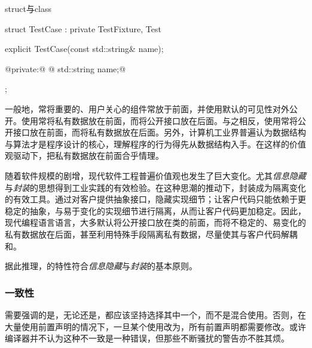 \begin{content}
\begin{episode}{struct与class}
\begin{content}
\begin{c++}
struct TestCase : private TestFixture, Test {
  explicit TestCase(const std::string& name);

@private:@
@  std::string name;@
};
\end{c++}

一般地，常将重要的、用户关心的组件常放于前面，并使用默认的可见性对外公开。使用常将私有数据放在前面，而将公开接口放在后面。与之相反，使用常将公开接口放在前面，而将私有数据放在后面。另外，计算机工业界普遍认为数据结构与算法才是程序设计的核心，理解程序的行为得先从数据结构入手。在这样的价值观驱动下，把私有数据放在前面合乎情理。

随着软件规模的剧增，现代软件工程普遍价值观也发生了巨大变化。尤其\emph{信息隐藏}与\emph{封装}的思想得到工业实践的有效检验。在这种思潮的推动下，封装成为隔离变化的有效工具。通过对客户提供抽象接口，隐藏实现细节；让客户代码只能依赖于更稳定的抽象，与易于变化的实现细节进行隔离，从而让客户代码更加稳定。因此，现代编程语言语言，大多默认将公开接口放在类的前面，而将不稳定的、易变化的私有数据放在后面，甚至利用特殊手段隔离私有数据，尽量使其与客户代码解耦和。

据此推理，的特性符合\emph{信息隐藏}与\emph{封装}的基本原则。

\subsubsection{一致性}

需要强调的是，无论还是，都应该坚持选择其中一个，而不是混合使用。否则，在大量使用前置声明的情况下，一旦某个使用改为，所有前置声明都需要修改。或许编译器并不认为这种不一致是一种错误，但那些不断骚扰的警告亦不胜其烦。

\end{content}
\end{episode}

\end{content}
